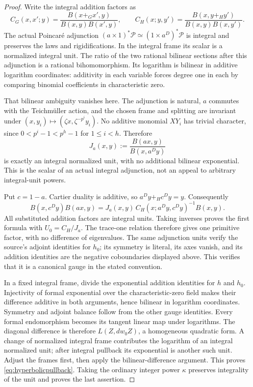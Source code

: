 \documentclass[11pt,a4paper]{article}
\theoremstyle{definition}\newtheorem{remark}[theorem]{Remark}
\begin{document}
\begin{proof}
Write the integral addition factors as
\[
 C_G(x,x';y)=\frac{B(x+_Gx',y)}{B(x,y)B(x',y)},\qquad
 C_H(x;y,y')=\frac{B(x,y+_Hy')}{B(x,y)B(x,y')}.
\]
The actual Poincar\'e adjunction
$(a\times1)^*\mathcal P\simeq(1\times a^D)^*\mathcal P$
is integral and preserves the laws and rigidifications. In the integral frame its scalar is a normalized integral unit.
The ratio of the two rational bilinear sections after this adjunction is a rational bihomomorphism. Its logarithm is bilinear in additive logarithm coordinates: additivity in each variable forces degree one in each by comparing binomial coefficients in characteristic zero.

That bilinear ambiguity vanishes here. The adjunction is natural, $a$ commutes with the Teichm\"uller action, and the chosen frame and splitting are invariant under
$(x,y_i)\mapsto(\zeta x,\zeta^{-p^i}y_i)$.
No additive monomial $XY_i$ has trivial character, since
$0<p^i-1<p^h-1$ for $1\le i<h$.
Therefore
\[
 J_a(x,y):=\frac{B(ax,y)}{B(x,a^Dy)}
\]
is exactly an integral normalized unit, with no additional bilinear exponential.
This is the scalar of an actual integral adjunction, not an appeal to arbitrary integral-unit powers.

Put $c=1-a$. Cartier duality is additive, so
$a^Dy+_Hc^Dy=y$. Consequently
\[
 B(x,c^Dy)B(ax,y)
 =J_a(x,y)\,C_H(x;a^Dy,c^Dy)^{-1}B(x,y).
\]
All substituted addition factors are integral units. Taking inverses proves the first formula with $U_0=C_H/J_a$.
The trace-one relation therefore gives one primitive factor, with no difference of eigenvalues.
The same adjunction units verify the source's adjoint identities for $h_0$; its symmetry is literal, its axes vanish, and its addition identities are the negative coboundaries displayed above. This verifies that it is a canonical gauge in the stated convention.

In a fixed integral frame, divide the exponential addition identities for $h$ and $h_0$. Injectivity of formal exponential over the characteristic-zero field makes their difference additive in both arguments, hence bilinear in logarithm coordinates.
Symmetry and adjoint balance follow from the other gauge identities.
Every formal endomorphism becomes its tangent linear map under logarithms. The diagonal difference is therefore $L(Z,dw_0Z)$, a homogeneous quadratic form.
A change of normalized integral frame contributes the logarithm of an integral normalized unit; after integral pullback its exponential is another such unit. Adjust the frames first, then apply the bilinear-difference argument. This proves \eqref{eq:hyperbolicpullback}. Taking the ordinary integer power $\kappa$ preserves integrality of the unit and proves the last assertion.
\end{proof}
\end{document}
